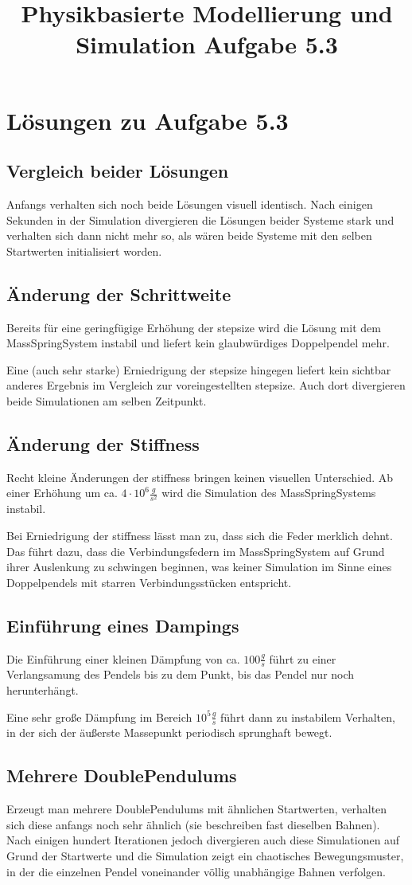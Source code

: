\documentclass[10pt,a4paper]{article}
\title{Physikbasierte Modellierung und Simulation Aufgabe 5.3}
\begin{document}
\section{Lösungen zu Aufgabe 5.3}

\subsection{Vergleich beider Lösungen}
Anfangs verhalten sich noch beide Lösungen visuell identisch. Nach einigen Sekunden in der Simulation divergieren die Lösungen beider Systeme stark und verhalten sich dann nicht mehr so, als wären beide Systeme mit den selben Startwerten initialisiert worden.

\subsection{Änderung der Schrittweite}
Bereits für eine geringfügige Erhöhung der stepsize wird die Lösung mit dem MassSpringSystem instabil und liefert kein glaubwürdiges Doppelpendel mehr.

Eine (auch sehr starke) Erniedrigung der stepsize hingegen liefert kein sichtbar anderes Ergebnis im Vergleich zur voreingestellten stepsize. Auch dort divergieren beide Simulationen am selben Zeitpunkt.

\subsection{Änderung der Stiffness}
Recht kleine Änderungen der stiffness bringen keinen visuellen Unterschied. Ab einer Erhöhung um ca. $4 \cdot 10^{6} \frac{g}{s^2}$ wird die Simulation des MassSpringSystems instabil.

Bei Erniedrigung der stiffness lässt man zu, dass sich die Feder merklich dehnt. Das führt dazu, dass die Verbindungsfedern im MassSpringSystem auf Grund ihrer Auslenkung zu schwingen beginnen, was keiner Simulation im Sinne eines Doppelpendels mit starren Verbindungsstücken entspricht.

\subsection{Einführung eines Dampings}
Die Einführung einer kleinen Dämpfung von ca. $100 \frac{g}{s}$ führt zu einer Verlangsamung des Pendels bis zu dem Punkt, bis das Pendel nur noch herunterhängt.

Eine sehr große Dämpfung im Bereich $10^5 \frac{g}{s}$ führt dann zu instabilem Verhalten, in der sich der äußerste Massepunkt periodisch sprunghaft bewegt.

\subsection{Mehrere DoublePendulums}
Erzeugt man mehrere DoublePendulums mit ähnlichen Startwerten, verhalten sich diese anfangs noch sehr ähnlich (sie beschreiben fast dieselben Bahnen). Nach einigen hundert Iterationen jedoch divergieren auch diese Simulationen auf Grund der Startwerte und die Simulation zeigt ein chaotisches Bewegungsmuster, in der die einzelnen Pendel voneinander völlig unabhängige Bahnen verfolgen.
\end{document}
